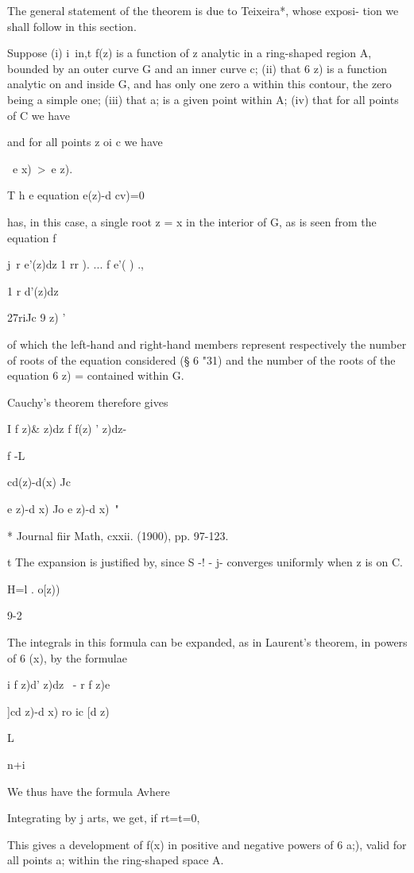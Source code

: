 The general statement of the theorem is due to Teixeira*, whose
exposi- tion we shall follow in this section.

Suppose (i) i\ in,t f(z) is a function of z analytic in a ring-shaped
region A, bounded by an outer curve G and an inner curve c; (ii) that
6 z) is a function analytic on and inside G, and has only one zero a
within this contour, the zero being a simple one; (iii) that a; is a
given point within A; (iv) that for all points of C we have

and for all points z oi c we have

\ e x)\ >\ e z).

T h e equation e(z)-d cv)=0

has, in this case, a single root z = x in the interior of G, as is
seen from the equation f

j\ r e'(z)dz 1 rr ). ... f e'( ) .,

1 r d'(z)dz

27riJc 9 z) '

of which the left-hand and right-hand members represent respectively
the number of roots of the equation considered (§ 6 "31) and the
number of the roots of the equation 6 z) = contained within G.

Cauchy's theorem therefore gives

I f z)\& z)dz f f(z) ' z)dz-

f -L

 cd(z)-d(x) Jc

e z)-d x) Jo e z)-d x)\ "

* Journal fiir Math, cxxii. (1900), pp. 97-123.

t The expansion is justified by, since S -! - j- converges
uniformly when z is on C.

H=l . o[z))

9-2

% 
%
The integrals in this formula can be expanded, as in Laurent's
theorem, in powers of 6 (x), by the formulae

i f z)d' z)dz \ - r f z)e

]cd z)-d x) ro ic [d z)\

L

n+i

We thus have the formula Avhere

Integrating by j arts, we get, if rt=t=0,

This gives a development of f(x) in positive and negative powers of 6
a;), valid for all points a; within the ring-shaped space A.

